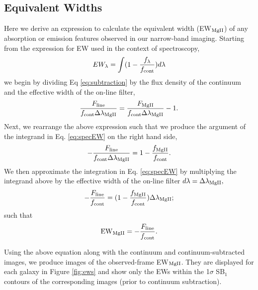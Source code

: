 \documentclass[trackchanges,twocolumn]{aastex62}
\begin{document}
\subsection{Equivalent Widths}\label{subsec.ew}
Here we derive an expression to calculate the equivalent width (EW$_{\rm{MgII}}$) of any absorption or emission features observed in our narrow-band imaging. Starting from the expression for EW used in the context of spectroscopy,
\begin{equation}
EW_{\lambda}=\int (1-\frac{f_{\lambda}}{f_{\rm{cont}}})d\lambda
\label{eq:specEW}
\end{equation}
we begin by dividing Eq \ref{eq:subtraction} by the flux density of the continuum and the effective width of the on-line filter,
\begin{equation}
\frac{F_{\rm{line}}}{f_{\rm{cont}}\Delta \lambda_{\rm{MgII}}}=\frac{F_{\rm{MgII}}}{f_{\rm{cont}}\Delta \lambda_{\rm{MgII}}}- 1.
\end{equation}
Next, we rearrange the above expression such that we produce the argument of the integrand in Eq. \ref{eq:specEW} on the right hand side,
\begin{equation}
-\frac{F_{\rm{line}}}{f_{\rm{cont}}\Delta \lambda_{\rm{MgII}}}=1-\frac{f_{\rm{MgII}}}{f_{\rm{cont}}}.
\end{equation}
We then approximate the integration in Eq. \ref{eq:specEW} by multiplying the integrand above by the effective width of the on-line filter $d\lambda=\Delta \lambda_{\rm{MgII}},$
\begin{equation}
-\frac{F_{\rm{line}}}{f_{\rm{cont}}}=(1-\frac{f_{\rm{MgII}}}{f_{\rm{cont}}})\Delta \lambda_{\rm{MgII}};
\end{equation}
such that
\begin{equation}
{\rm EW}_{\rm{MgII}}=-\frac{F_{\rm{line}}}{f_{\rm{cont}}}.
\end{equation}

Using the above equation along with the continuum and continuum-subtracted images, we produce images of the observed-frame EW$_{\rm{MgII}}$. %
They are displayed for each galaxy in Figure \ref{fig:ews} and show only the EWs within the 1$\sigma$ SB$_1$ contours of the corresponding  images (prior to continuum subtraction). 
\end{document}
